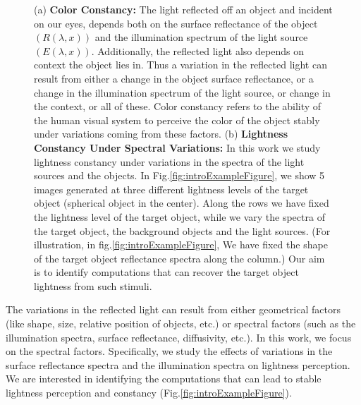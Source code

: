 \documentclass{jov}
\begin{document}
\begin{figure}[h]
    \caption{(a) {\bf Color Constancy:} The light reflected off an object and incident on our eyes, depends both on the surface reflectance of the object $\left( R(\lambda,x) \right)$ and the illumination spectrum of the light source $\left(E(\lambda,x)\right)$. Additionally, the reflected light also depends on context the object lies in. Thus a variation in the reflected light can result from either a change in the object surface reflectance, or a change in the illumination spectrum of the light source, or change in the context, or all of these. Color constancy refers to the ability of the human visual system to perceive the color of the object stably under variations coming from these factors. (b) {\bf Lightness Constancy Under Spectral Variations:} In this work we study lightness constancy under variations in the spectra of the light sources and the objects. In Fig.\ref{fig:introExampleFigure}, we show 5 images generated at three different lightness levels of the target object (spherical object in the center). Along the rows we have fixed the lightness level of the target object, while we vary the spectra of the target object, the background objects and the light sources. (For illustration, in fig.\ref{fig:introExampleFigure}, We have fixed the shape of the target object reflectance spectra along the column.) Our aim is to identify computations that can recover the target object lightness from such stimuli.} 
\end{figure}

The variations in the reflected light can result from either geometrical factors (like shape, size, relative position of objects, etc.) or spectral factors (such as the illumination spectra, surface reflectance, diffusivity, etc.). In this work, we focus on the spectral factors. Specifically, we study the effects of variations in the surface reflectance spectra and the illumination spectra on lightness perception. We are interested in identifying the computations that can lead to stable lightness perception and constancy (Fig.\ref{fig:introExampleFigure}).
\end{document}
